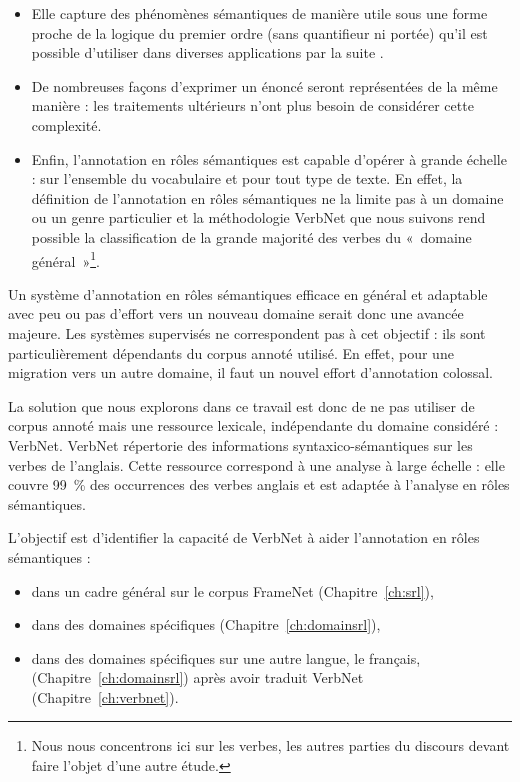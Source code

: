 \documentclass[oneside,parskip,draft]{scrbook}
\begin{document}
\begin{itemize}

    \item Elle capture des phénomènes sémantiques de manière utile sous une
        forme proche de la logique du premier ordre (sans quantifieur ni
        portée) qu'il est possible d'utiliser dans diverses applications par la
        suite \citep{osman2012improved,xie2013semantic}.

    \item De nombreuses façons d'exprimer un énoncé seront représentées de la
        même manière : les traitements ultérieurs n'ont plus besoin de
        considérer cette complexité.

    \item Enfin, l'annotation en rôles sémantiques est capable d'opérer à
        grande échelle : sur l'ensemble du vocabulaire et pour tout type de
        texte.  En effet, la définition de l'annotation en rôles sémantiques ne
        la limite pas à un domaine ou un genre particulier et la méthodologie
        VerbNet que nous suivons rend possible la classification de la grande
        majorité des verbes du «~domaine général~»\footnote{Nous nous
            concentrons ici sur les verbes, les autres parties du discours
        devant faire l'objet d'une autre étude.}.

\end{itemize}

Un système d'annotation en rôles sémantiques efficace en général et adaptable
avec peu ou pas d'effort vers un nouveau domaine serait donc une avancée
majeure. Les systèmes supervisés ne correspondent pas à cet objectif : ils sont
particulièrement dépendants du corpus annoté utilisé. En effet, pour une
migration vers un autre domaine, il faut un nouvel effort d'annotation
colossal.

La solution que nous explorons dans ce travail est donc de ne pas utiliser de
corpus annoté mais une ressource lexicale, indépendante du domaine considéré :
VerbNet. VerbNet répertorie des informations syntaxico-sémantiques sur les
verbes de l'anglais.  Cette ressource correspond à une analyse à large échelle
: elle couvre 99~\% des occurrences des verbes anglais \citep[partie 1,
p~.53]{palmer2013semantic} et est adaptée à l'analyse en rôles sémantiques.

L'objectif est d'identifier la capacité de VerbNet à aider l'annotation en
rôles sémantiques :
\begin{itemize}
    \item dans un cadre général sur le corpus FrameNet (Chapitre~\ref{ch:srl}),
    \item dans des domaines spécifiques (Chapitre~\ref{ch:domainsrl}),
    \item dans des domaines spécifiques sur une autre langue, le français, (Chapitre~\ref{ch:domainsrl}) après avoir traduit VerbNet (Chapitre~\ref{ch:verbnet}).
\end{itemize}
\end{document}
